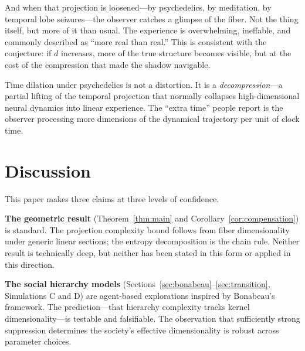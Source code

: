 \documentclass[12pt,a4paper]{article}
\begin{document}
And when that projection is loosened---by psychedelics, by meditation, by temporal lobe seizures---the observer catches a glimpse of the fiber.
Not the thing itself, but more of it than usual.
The experience is overwhelming, ineffable, and commonly described as ``more real than real.''
This is consistent with the conjecture: if $d$ increases, more of the true structure becomes visible, but at the cost of the compression that made the shadow navigable.

Time dilation under psychedelics is not a distortion.
It is a \emph{decompression}---a partial lifting of the temporal projection that normally collapses high-dimensional neural dynamics into linear experience.
The ``extra time'' people report is the observer processing more dimensions of the dynamical trajectory per unit of clock time.

\medskip
\noindent{}



\section{Discussion}
\label{sec:discussion}

This paper makes three claims at three levels of confidence.

\textbf{The geometric result} (Theorem~\ref{thm:main} and Corollary~\ref{cor:compensation}) is standard.
The projection complexity bound follows from fiber dimensionality under generic linear sections; the entropy decomposition is the chain rule.
Neither result is technically deep, but neither has been stated in this form or applied in this direction.

\textbf{The social hierarchy models} (Sections~\ref{sec:bonabeau}--\ref{sec:transition}, Simulations C and D) are agent-based explorations inspired by Bonabeau's framework.
The prediction---that hierarchy complexity tracks kernel dimensionality---is testable and falsifiable.
The observation that sufficiently strong suppression determines the society's effective dimensionality is robust across parameter choices.
\end{document}

